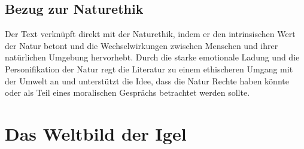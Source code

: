 \documentclass{article}
\begin{document}
\subsection{Bezug zur Naturethik}
Der Text verknüpft direkt mit der Naturethik, indem er den intrinsischen Wert der Natur betont und die Wechselwirkungen zwischen Menschen und ihrer natürlichen Umgebung hervorhebt. Durch die starke emotionale Ladung und die Personifikation der Natur regt die Literatur zu einem ethischeren Umgang mit der Umwelt an und unterstützt die Idee, dass die Natur Rechte haben könnte oder als Teil eines moralischen Gesprächs betrachtet werden sollte.

\newpage
\section{Das Weltbild der Igel}
\end{document}
